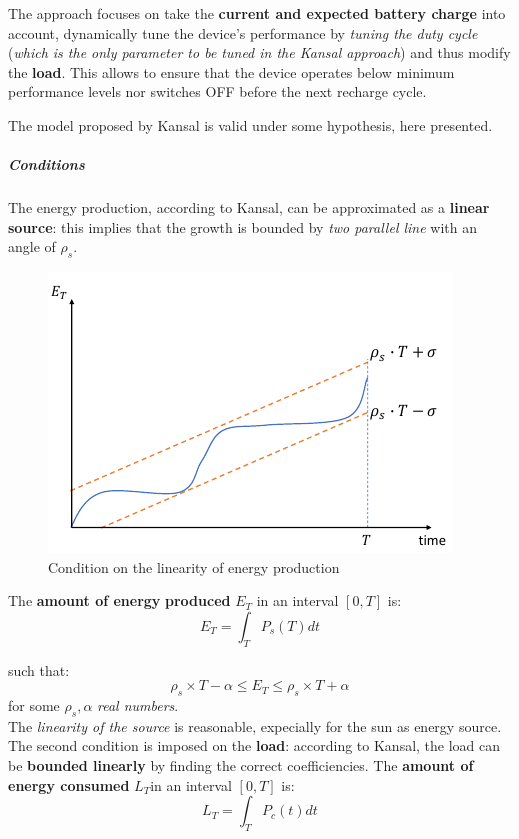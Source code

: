 \documentclass[10pt,a4paper]{report}
\theoremstyle{definition}
\begin{document}
The approach focuses on take the \textbf{current and expected battery charge} into account, dynamically tune the device's performance by \textit{tuning the duty cycle} (\textit{which is the only parameter to be tuned in the Kansal approach}) and thus modify the \textbf{load}. This allows to ensure that the device operates below minimum performance levels nor switches OFF before the next
recharge cycle.

The model proposed by Kansal is valid under some hypothesis, here presented.

\subparagraph{Conditions}

The energy production, according to Kansal, can be  approximated as a \textbf{linear source}: this implies that the growth is bounded by \textit{two parallel line} with an angle of $\rho_{s}$.
\begin{figure}[h]
	\centering\includegraphics[scale=0.50]{images/Pasted image 20230509152717.png}
	\caption{Condition on the linearity of energy production}
\end{figure}



The \textbf{amount of energy} \textbf{produced}  $E_{T}$ in an interval $[0,T]$ is:
\begin{equation}
	E_{T} = \int_{T}P_{s}(T)dt
\end{equation}

such that:
\begin{equation}
	\rho_{s} \times T - \alpha \leq E_{T} \leq \rho_{s} \times T + \alpha
\end{equation}
for some $\rho_{s}, \alpha$ \textit{real numbers}.\\
The \textit{linearity of the source} is reasonable, expecially for the sun as energy source.\\
The second condition is imposed on the \textbf{load}: according to Kansal, the load can be \textbf{bounded linearly} by finding the correct coefficiencies.
The \textbf{amount of energy consumed} $L_{T}$in an interval $[0,T]$ is:
\begin{equation}
	L_{T} = \int_{T}P_{c}(t)dt
\end{equation}
\end{document}
